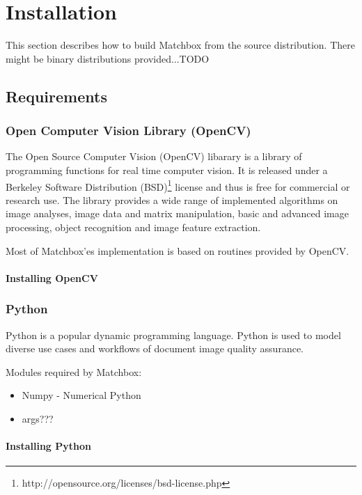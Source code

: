 \section{Installation}

This section describes how to build Matchbox from the source distribution. There might be binary distributions provided...TODO


\subsection{Requirements}

\subsubsection{Open Computer Vision Library (OpenCV)}

The Open Source Computer Vision (OpenCV) libarary \cite{opencv_library} is a library of programming functions for real time computer vision.
It is released under a Berkeley Software Distribution (BSD)\footnote{http://opensource.org/licenses/bsd-license.php} license and thus is free for commercial or research use.
The library provides a wide range of implemented algorithms on image analyses, image data and matrix manipulation, basic and advanced image processing, object recognition and image feature extraction.

Most of Matchbox'es implementation is based on routines provided by OpenCV. 

\paragraph{Installing OpenCV}


\subsubsection{Python}

Python is a popular dynamic programming language. 
Python is used to model diverse use cases and workflows of document image quality assurance.

Modules required by Matchbox:

\begin{itemize}
	\item Numpy - Numerical Python
	\item args???
\end{itemize}


\paragraph{Installing Python}


